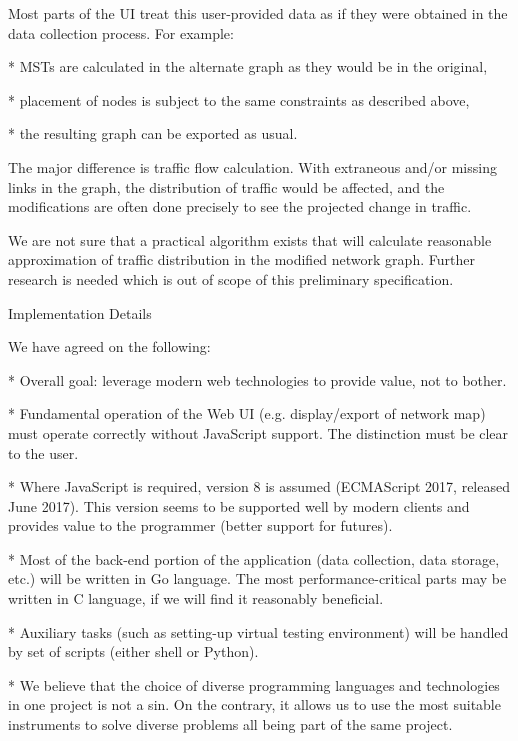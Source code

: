 Most parts of the UI treat this user-provided data as if they were obtained in
the data collection process. For example:

\begitems

* MSTs are calculated in the alternate graph as they would be in the original,

* placement of nodes is subject to the same constraints as described above,

* the resulting graph can be exported as usual.

\enditems

The major difference is traffic flow calculation. With extraneous and/or
missing links in the graph, the distribution of traffic would be affected, and
the modifications are often done precisely to see the projected change in
traffic.

We are not sure that a practical algorithm exists that will calculate reasonable
approximation of traffic distribution in the modified network graph. Further
research is needed which is out of scope of this preliminary specification.

\secc Implementation Details

We have agreed on the following:

\begitems

* Overall goal: leverage modern web technologies to provide value, not to bother.

* Fundamental operation of the Web UI (e.g. display/export of network map) must
operate correctly without JavaScript support. The distinction must be clear to
the user.

* Where JavaScript is required, version 8 is assumed (ECMAScript 2017, released
June 2017). This version seems to be supported well by modern clients and
provides value to the programmer (better support for futures).

* Most of the back-end portion of the application (data collection, data
storage, etc.) will be written in Go language. The most performance-critical
parts may be written in C language, if we will find it reasonably beneficial.

* Auxiliary tasks (such as setting-up virtual testing environment) will be
handled by set of scripts (either shell or Python).

* We believe that the choice of diverse programming languages and technologies
in one project is not a sin. On the contrary, it allows us to use the most
suitable instruments to solve diverse problems all being part of the same
project.

\enditems

\bye

